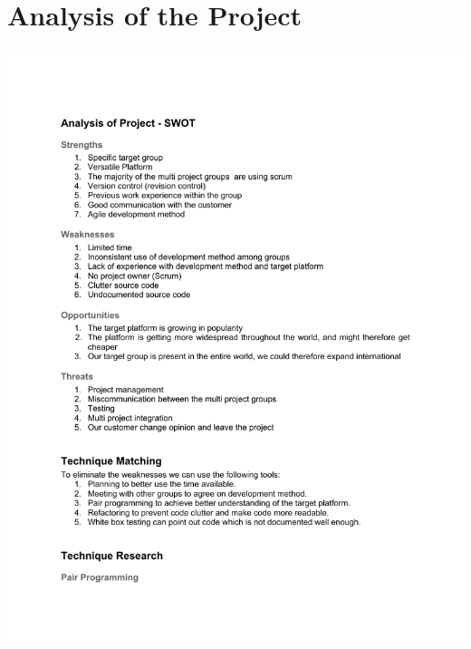 \section{Analysis of the Project}
\label{sec:swot}
\begin{center}
		\includegraphics[width=\textwidth]{Appendix/SWOT.pdf}
	\end{center}

